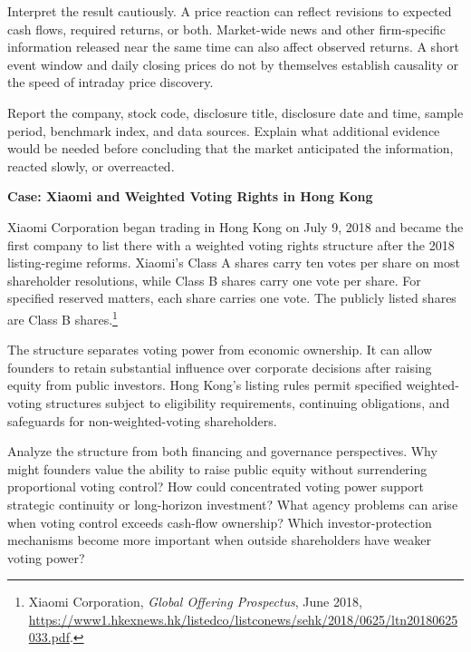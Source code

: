 Interpret the result cautiously. A price reaction can reflect revisions to expected cash flows, required returns, or both. Market-wide news and other firm-specific information released near the same time can also affect observed returns. A short event window and daily closing prices do not by themselves establish causality or the speed of intraday price discovery.

Report the company, stock code, disclosure title, disclosure date and time, sample period, benchmark index, and data sources. Explain what additional evidence would be needed before concluding that the market anticipated the information, reacted slowly, or overreacted.




\textbf{Case: Xiaomi and Weighted Voting Rights in Hong Kong}

Xiaomi Corporation began trading in Hong Kong on July 9, 2018 and became the first company to list there with a weighted voting rights structure after the 2018 listing-regime reforms. Xiaomi's Class A shares carry ten votes per share on most shareholder resolutions, while Class B shares carry one vote per share. For specified reserved matters, each share carries one vote. The publicly listed shares are Class B shares.\footnote{Xiaomi Corporation, \emph{Global Offering Prospectus}, June 2018, \url{https://www1.hkexnews.hk/listedco/listconews/sehk/2018/0625/ltn20180625033.pdf}.}

The structure separates voting power from economic ownership. It can allow founders to retain substantial influence over corporate decisions after raising equity from public investors. Hong Kong's listing rules permit specified weighted-voting structures subject to eligibility requirements, continuing obligations, and safeguards for non-weighted-voting shareholders.

Analyze the structure from both financing and governance perspectives. Why might founders value the ability to raise public equity without surrendering proportional voting control? How could concentrated voting power support strategic continuity or long-horizon investment? What agency problems can arise when voting control exceeds cash-flow ownership? Which investor-protection mechanisms become more important when outside shareholders have weaker voting power?

